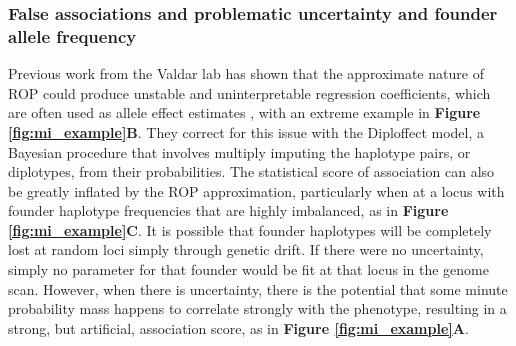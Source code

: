 \subsubsection{False associations and problematic uncertainty and founder allele frequency}

Previous work from the Valdar lab has shown that the approximate nature of ROP could produce unstable and uninterpretable regression coefficients, which are often used as allele effect estimates \citep{Zhang2014}, with an extreme example in \textbf{Figure \ref{fig:mi_example}B}. They correct for this issue with the Diploffect model, a Bayesian procedure that involves multiply imputing the haplotype pairs, or diplotypes, from their probabilities. The statistical score of association can also be greatly inflated by the ROP approximation, particularly when at a locus with founder haplotype frequencies that are highly imbalanced, as in \textbf{Figure \ref{fig:mi_example}C}. It is possible that founder haplotypes will be completely lost at random loci simply through genetic drift. If there were no uncertainty, simply no parameter for that founder would be fit at that locus in the genome scan. However, when there is uncertainty, there is the potential that some minute probability mass happens to correlate strongly with the phenotype, resulting in a strong, but artificial, association score, as in \textbf{Figure \ref{fig:mi_example}A}.  

